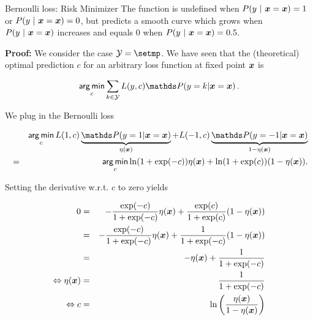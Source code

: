 \begin{vbframe}{Bernoulli loss: Risk Minimizer}
The function is undefined when $P(y~|~\bm{x} = \bm{x}) = 1$ or $P(y~|~\bm{x} = \bm{x}) = 0$, but predicts a smooth curve which grows when $P(y~|~\bm{x} = \bm{x})$ increases and equals $0$ when $P(y~|~\bm{x} = \bm{x}) = 0.5$.

\lz 

\textbf{Proof: } We consider the case $\Yspace = \setmp$. We have seen that the (theoretical) optimal prediction $c$ for an arbitrary loss function at fixed point $\bm{x}$ is

$$
\argmin_{c} \sum_{k \in \Yspace} L(y, c) \P(y = k| \xv = \xv)\,.
$$

\framebreak 

We plug in the Bernoulli loss

\vspace*{-0.3cm}

\begin{footnotesize}
  \begin{eqnarray*}
    && \argmin_c L(1, c) \underbrace{\P(y = 1| \xv = \xv)}_{\eta(\xv)} + L(-1, c) \underbrace{\P(y = -1| \xv = \xv)}_{1 - \eta(\xv)} \\ 
    &=&  \argmin_c \ln(1 + \exp(-c)) \eta(\xv)+ \ln(1 + \exp(c)) (1 - \eta(\xv)).
  \end{eqnarray*}
\end{footnotesize}

\vspace*{-0.3cm}

Setting the derivative w.r.t. $c$ to zero yields

\vspace*{-0.3cm}

\begin{footnotesize}
  \begin{eqnarray*}
  0 &=& - \frac{\exp(-c)}{1 + \exp(-c)} \eta(\bm{x}) + \frac{\exp(c)}{1 + \exp(c)} (1 - \eta(\bm{x})) \\ 
   &=& - \frac{\exp(-c)}{1 + \exp(-c)} \eta(\bm{x}) + \frac{1}{1 + \exp(- c)} (1 - \eta(\bm{x})) \\ 
  &=& - \eta(\bm{x}) + \frac{1}{1 + \exp(-c)} \\
  \Leftrightarrow \eta(\bm{x}) &=& \frac{1}{1 + \exp(-c)} \\
  \Leftrightarrow c &=& \ln\left(\frac{\eta(\bm{x})}{1 - \eta(\bm{x})}\right)
  \end{eqnarray*}
\end{footnotesize}






\end{vbframe}



